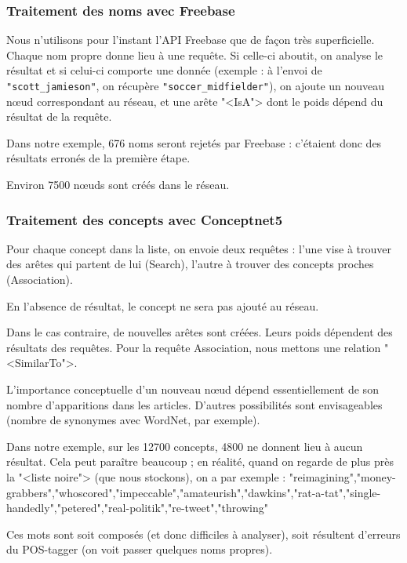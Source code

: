 \documentclass[a4paper,12pt]{article}
\begin{document}
\subsubsection{Traitement des noms avec Freebase}

Nous n'utilisons pour l'instant l'API Freebase que de fa\c{c}on tr\`es superficielle. Chaque nom propre donne lieu \`a une requ\^ete. Si celle-ci aboutit, on analyse le r\'esultat et si celui-ci comporte une donn\'ee (exemple : \`a l'envoi de \verb|"scott_jamieson"|, on r\'ecup\`ere \verb|"soccer_midfielder"|), on ajoute un nouveau nœud correspondant au r\'eseau, et une ar\^ete "<IsA"> dont le poids d\'epend du r\'esultat de la requ\^ete.

Dans notre exemple, 676 noms seront rejet\'es par Freebase : c'\'etaient donc des r\'esultats erron\'es de la premi\`ere \'etape.

Environ 7500 nœuds sont cr\'e\'es dans le r\'eseau.

\subsubsection{Traitement des concepts avec Conceptnet5}

Pour chaque concept dans la liste, on envoie deux requ\^etes : l'une vise \`a trouver des ar\^etes qui partent de lui (Search), l'autre \`a trouver des concepts proches (Association). 

En l'absence de r\'esultat, le concept ne sera pas ajout\'e au r\'eseau.

Dans le cas contraire, de nouvelles ar\^etes sont cr\'e\'ees. Leurs poids d\'ependent des r\'esultats des requ\^etes. Pour la requ\^ete Association, nous mettons une relation "<SimilarTo">.

L'importance conceptuelle d'un nouveau nœud d\'epend essentiellement de son nombre d'apparitions dans les articles. D'autres possibilit\'es sont envisageables (nombre de synonymes avec WordNet, par exemple).

Dans notre exemple, sur les 12700 concepts, 4800 ne donnent lieu \`a aucun r\'esultat. Cela peut para\^itre beaucoup ; en r\'ealit\'e, quand on regarde de plus pr\`es la "<liste noire"> (que nous stockons), on a par exemple : "reimagining","money-grabbers","whoscored","impeccable","amateurish","dawkins","rat-a-tat","single-handedly","petered","real-politik","re-tweet","throwing"

Ces mots sont soit compos\'es (et donc difficiles \`a analyser), soit r\'esultent d'erreurs du POS-tagger (on voit passer quelques noms propres).
\end{document}
